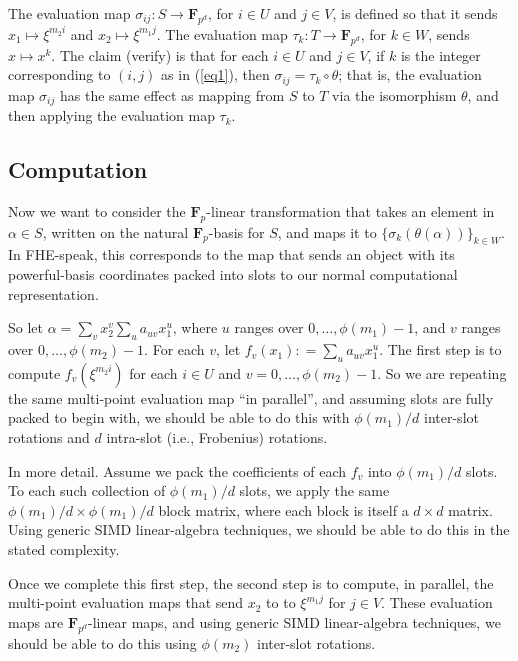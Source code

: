 \documentclass[11pt]{article}
\newcommand{\FF}{\mathbf{F}}
\newcommand{\deq}{\mathrel{\mathop:}=}
\begin{document}
The evaluation map $\sigma_{i j} : S \rightarrow \FF_{p^d}$,
for $i \in U$ and $j \in V$, is defined so that
it sends $x_1 \mapsto \xi^{m_2 i}$ and $x_2 \mapsto \xi^{m_1 j}$.
The evaluation map $\tau_k : T \rightarrow \FF_{p^d}$,
for $k \in W$, sends $x \mapsto x^k$.
The claim (verify) is that for each $i \in U$ and $j \in V$,
if $k$ is the integer corresponding to $(i, j)$ as in (\ref{eq1}),
then
$\sigma_{i j} = \tau_k \circ \theta$;
that is, the evaluation map $\sigma_{i j}$ has the same effect as
mapping from $S$ to $T$ via the isomorphism $\theta$,
and then applying the evaluation map $\tau_k$.

\subsection*{Computation}

Now we want to consider the $\FF_p$-linear transformation 
that takes an element in $\alpha \in S$,
written on the natural $\FF_p$-basis for $S$,
and maps it to $\{\sigma_k(\theta(\alpha))\}_{k\in W}$.
In FHE-speak, this corresponds to the map that sends an object 
with its powerful-basis coordinates packed into slots to our
normal computational representation.

So let $\alpha = \sum_v x_2^v \sum_u a_{u v} x_1^u$,
where $u$ ranges over $0, \ldots, \phi(m_1)-1$,
and $v$ ranges over $0, \ldots, \phi(m_2)-1$. 
For each $v$, let $f_v(x_1) \deq \sum_u a_{u v} x_1^u$.
The first step is to compute 
$f_v(\xi^{m_2 i})$ for each $i \in U$  and $v = 0, \ldots, \phi(m_2)-1$.
So we are repeating the same multi-point evaluation map ``in parallel'',
and assuming slots are fully packed to begin with, we should be
able to do this 
with $\phi(m_1)/d$ inter-slot rotations and $d$ intra-slot (i.e., Frobenius)
rotations.

In more detail.
Assume we pack the coefficients of each $f_v$
into $\phi(m_1)/d$ slots.
To each such collection of $\phi(m_1)/d$ slots, 
we apply the same $\phi(m_1)/d \times \phi(m_1)/d$
block matrix, where each block is itself a $d \times d$ matrix.
Using generic SIMD linear-algebra techniques,
we should be able to do this in the stated complexity. 

Once we complete this first step, the second step is
to compute, in parallel, the multi-point evaluation maps that send
$x_2$ to to $\xi^{m_1 j}$ for $j \in V$.
These evaluation maps are $\FF_{p^d}$-linear maps,
and using generic SIMD linear-algebra techniques,
we should be able to do this using $\phi(m_2)$ inter-slot rotations.
\end{document}
